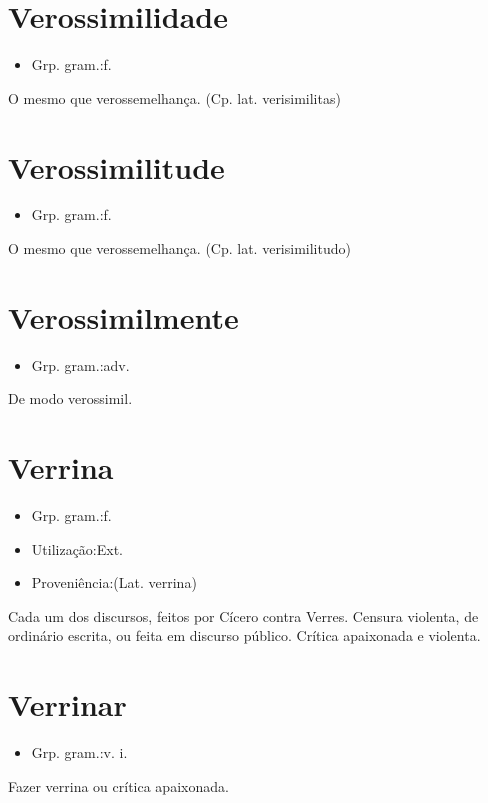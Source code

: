 \documentclass{article}
\begin{document}
\section{Verossimilidade}
\begin{itemize}
\item {Grp. gram.:f.}
\end{itemize}
O mesmo que \textunderscore verossemelhança\textunderscore .
(Cp. lat. \textunderscore verisimilitas\textunderscore )
\section{Verossimilitude}
\begin{itemize}
\item {Grp. gram.:f.}
\end{itemize}
O mesmo que \textunderscore verossemelhança\textunderscore .
(Cp. lat. \textunderscore verisimilitudo\textunderscore )
\section{Verossimilmente}
\begin{itemize}
\item {Grp. gram.:adv.}
\end{itemize}
De modo verossimil.
\section{Verrina}
\begin{itemize}
\item {Grp. gram.:f.}
\end{itemize}
\begin{itemize}
\item {Utilização:Ext.}
\end{itemize}
\begin{itemize}
\item {Proveniência:(Lat. \textunderscore verrina\textunderscore )}
\end{itemize}
Cada um dos discursos, feitos por Cícero contra Verres.
Censura violenta, de ordinário escrita, ou feita em discurso público.
Crítica apaixonada e violenta.
\section{Verrinar}
\begin{itemize}
\item {Grp. gram.:v. i.}
\end{itemize}
Fazer verrina ou crítica apaixonada.
\end{document}
